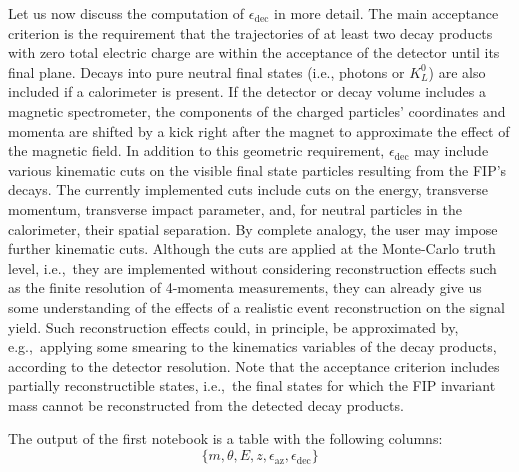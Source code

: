 \documentclass[
    aps,prd,
    twocolumn,
    nofootinbib,
    superscriptaddress,
]{revtex4}
\begin{document}
Let us now discuss the computation of $\epsilon_{\text{dec}}$ in more detail. The main acceptance criterion is the requirement that the trajectories of at least two decay products with zero total electric charge are within the acceptance of the detector until its final plane. Decays into pure neutral final states (i.e., photons or $K^{0}_{L}$) are also included if a calorimeter is present. If the detector or decay volume includes a magnetic spectrometer, the components of the charged particles' coordinates and momenta are shifted by a kick right after the magnet to approximate the effect of the magnetic field. In addition to this geometric requirement, $\epsilon_{\text{dec}}$ may include various kinematic cuts on the visible final state particles resulting from the FIP's decays. The currently implemented cuts include cuts on the energy, transverse momentum, transverse impact parameter, and, for neutral particles in the calorimeter, their spatial separation. By complete analogy, the user may impose further kinematic cuts. Although the cuts are applied at the Monte-Carlo truth level, i.e.,\ they are implemented without considering reconstruction effects such as the finite resolution of 4-momenta measurements, they can already give us some understanding of the effects of a realistic event reconstruction on the signal yield. Such reconstruction effects could, in principle, be approximated by, e.g.,\ applying some smearing to the kinematics variables of the decay products, according to the detector resolution. Note that the acceptance criterion includes partially reconstructible states, i.e.,\ the final states for which the FIP invariant mass cannot be reconstructed from the detected decay products.

The output of the first notebook is a table with the following columns: 
\begin{equation}
\{m,\theta,E,z,\epsilon_{\text{az}},\epsilon_{\text{dec}}\}
\end{equation}
\end{document}
